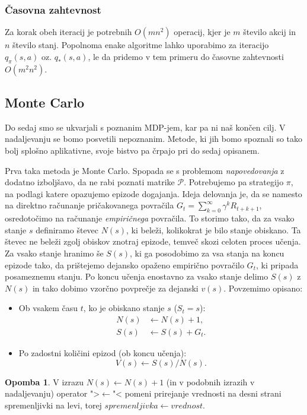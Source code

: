 \documentclass[12pt,a4paper]{amsart}
\theoremstyle{definition} %
\newtheorem{opomba}[definicija]{Opomba}
\theoremstyle{plain} %
\begin{document}
\subsubsection{Časovna zahtevnost}
Za korak obeh iteracij je potrebnih $O(mn^2)$ operacij, kjer je $m$ število akcij in $n$ število 
stanj. Popolnoma enake algoritme lahko uporabimo za iteracijo $q_\pi(s, a)$ oz. $q_*(s, a)$, le 
da pridemo v tem primeru do časovne zahtevnosti $O(m^2n^2)$.

\subsection{Monte Carlo}
Do sedaj smo se ukvarjali s poznanim MDP-jem, kar pa ni naš končen cilj. V nadaljevanju se bomo 
posvetili nepoznanim. Metode, ki jih bomo spoznali so tako bolj splošno aplikativne, svoje 
bistvo pa črpajo pri do sedaj opisanem.

Prva taka metoda je Monte Carlo. Spopada se s problemom \textit{napovedovanja} z dodatno izboljšavo, 
da ne rabi poznati matrike $\mathcal{P}$. Potrebujemo pa strategijo $\pi$, na podlagi katere opazujemo
epizode dogajanja. Ideja delovanja je, da se namesto na direktno računanje pričakovanega povračila
$G_t = \sum_{k=0}^\infty \gamma^k R_{t + k + 1}$, osredotočimo na računanje \textit{empiričnega} 
povračila. To storimo tako, da za vsako stanje $s$ definiramo števec $N(s)$, ki beleži, kolikokrat 
je bilo stanje obiskano. Ta števec ne beleži zgolj obiskov znotraj epizode, temveč skozi celoten 
proces učenja. Za vsako stanje hranimo še $S(s)$, ki ga posodobimo za vsa stanja na koncu epizode
tako, da prištejemo dejansko opaženo empirično povračilo $G_t$, ki pripada posameznemu stanju.
Po koncu učenja enostavno za vsako stanje delimo $S(s)$ z $N(s)$ in tako dobimo vzorčno povprečje za 
dejanski $v(s)$. Povzemimo opisano:
\begin{itemize}
    \item Ob vsakem času $t$, ko je obiskano stanje $s$ ($S_t = s$): 
        \begin{align*}
            N(s) &\leftarrow N(s) + 1, \\
            S(s) &\leftarrow S(s) + G_t.
        \end{align*}
    \item Po zadostni količini epizod (ob koncu učenja): 
        $$
        V(s) \leftarrow S(s) / N(s).
        $$
\end{itemize}

\begin{opomba}
    V izrazu $N(s) \leftarrow N(s) + 1$ (in v podobnih izrazih v nadaljevanju) operator ">$\leftarrow$"<
    pomeni prirejanje vrednosti na desni strani spremenljivki na levi, torej $spremenljivka \leftarrow vrednost$.
\end{opomba}
\end{document}
